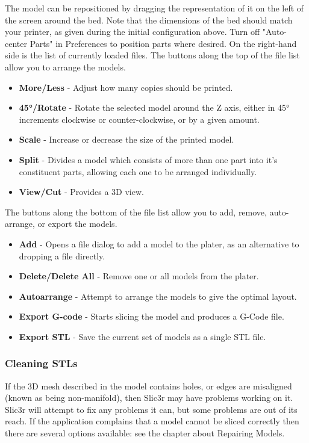 The model can be repositioned by dragging the representation of it on the left of the screen around the bed.  Note that the dimensions of the bed should match your printer, as given during the initial configuration above. Turn off "Auto-center Parts" in Preferences to position parts where desired.
On the right-hand side is the list of currently loaded files.  The buttons along the top of the file list allow you to arrange the models.
\begin{itemize}
	\item \textbf{More/Less}  - Adjust how many copies should be printed.
	\item \textbf{45°/Rotate}  - Rotate the selected model around the Z axis, either in 45° increments clockwise or counter-clockwise, or by a given amount.
	\item \textbf{Scale}  - Increase or decrease the size of the printed model.
	\item \textbf{Split}  - Divides a model which consists of more than one part into it's constituent parts, allowing each one to be arranged individually.
	\item \textbf{View/Cut}  - Provides a 3D view.

\end{itemize}

The buttons along the bottom of the file list allow you to add, remove, auto-arrange, or export the models.
\begin{itemize}
	\item \textbf{Add}  - Opens a file dialog to add a model to the plater, as an alternative to dropping a file directly.
	\item \textbf{Delete/Delete All}  - Remove one or all models from the plater.
	\item \textbf{Autoarrange}  - Attempt to arrange the models to give the optimal layout.
	\item \textbf{Export G-code}  - Starts slicing the model and produces a G-Code file.
	\item \textbf{Export STL}  - Save the current set of models as a single STL file.
\end{itemize}



\subsubsection{Cleaning STLs} %
\label{sub:cleaning_stls}
If the 3D mesh described in the model contains holes, or edges are misaligned (known as being non-manifold), then Slic3r may have problems working on it.  Slic3r will attempt to fix any problems it can, but some problems are out of its reach.  If the application complains that a model cannot be sliced correctly then there are several options available: see the chapter about Repairing Models.

